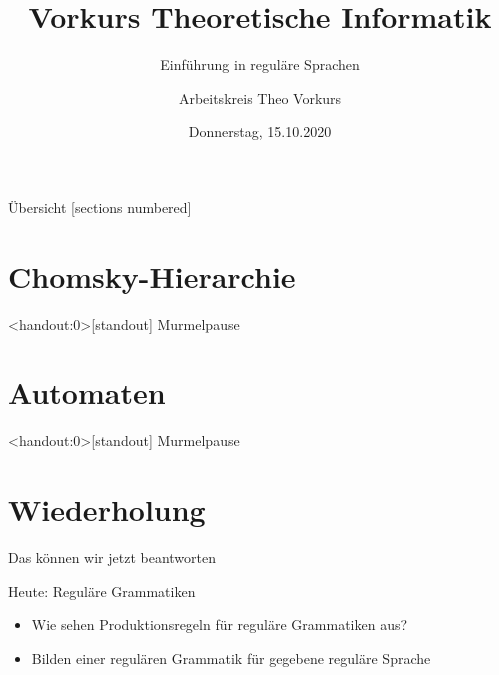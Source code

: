 

\title{Vorkurs Theoretische Informatik}
\subtitle{Einführung in reguläre Sprachen}
\date{Donnerstag, 15.10.2020}
\author{Arbeitskreis  Theo Vorkurs}



\maketitle

\begin{frame}[fragile]{Übersicht}
  [sections numbered]
  \tableofcontents%
\end{frame}


\section{Chomsky-Hierarchie}



\begin{frame}<handout:0>[standout]
  Murmelpause
\end{frame}

\section{Automaten}



\begin{frame}<handout:0>[standout]
  Murmelpause
\end{frame}





\section{Wiederholung}


\begin{frame}[fragile]{Das können wir jetzt beantworten}
  \begin{alertblock}{Heute: Reguläre Grammatiken}
    \begin{itemize}
      \item Wie sehen Produktionsregeln für reguläre Grammatiken aus?
      \item Bilden einer regulären Grammatik für gegebene reguläre Sprache
    \end{itemize}
  \end{alertblock}
\end{frame}

